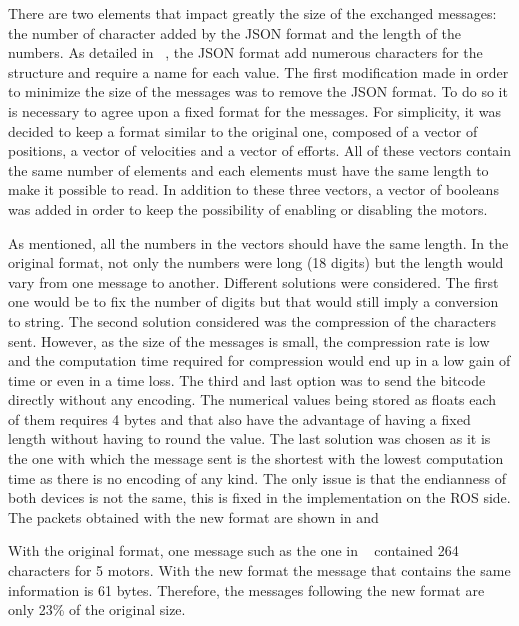 {\color{red}There are two elements that impact greatly the size of the exchanged messages: the number of character added by the JSON format and the length of the numbers.
As detailed in ~, the JSON format add numerous characters for the structure and require a name for each value. The first modification made in order to minimize the size of the messages was to remove the JSON format. To do so it is necessary to agree upon a fixed format for the messages. For simplicity, it was decided to keep a format similar to the original one, composed of a vector of positions, a vector of velocities and a vector of efforts. All of these vectors contain the same number of elements and each elements must have the same length to make it possible to read. In addition to these three vectors, a vector of booleans was added in order to keep the possibility of enabling or disabling the motors.

As mentioned, all the numbers in the vectors should have the same length. In the original format, not only the numbers were long (18 digits) but the length would vary from one message to another. Different solutions were considered. The first one would be to fix the number of digits but that would still imply a conversion to string. The second solution considered was the compression of the characters sent. However, as the size of the messages is small, the compression rate is low and the computation time required for compression would end up in a low gain of time or even in a time loss. The third and last option was to send the bitcode directly without any encoding. The numerical values being stored as floats each of them requires 4 bytes and that also have the advantage of having a fixed length without having to round the value. The last solution was chosen as it is the one with which the message sent is the shortest with the lowest computation time as there is no encoding of any kind. The only issue is that the endianness of both devices is not the same, this is fixed in the implementation on the ROS side. The packets obtained with the new format are shown in  and 

With the original format, one message such as the one in ~ contained 264 characters for 5 motors. With the new format the message that contains the same information is 61 bytes. Therefore, the messages following the new format are only 23\% of the original size.

}

